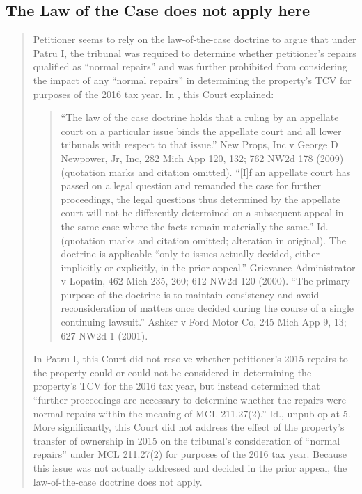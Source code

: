 \documentclass[12pt,\documentclassflag]{michiganCourtOfAppealsBrief}
\begin{document}
\subsection{The Law of the Case does not apply here}
\begin {quotation}
  Petitioner seems to rely on the law-of-the-case doctrine to argue that under Patru I, the
tribunal was required to determine whether petitioner's repairs qualified as ``normal repairs'' and
was further prohibited from considering the impact of any ``normal repairs'' in determining the
property's TCV for purposes of the 2016 tax year. In , 
this Court explained:

\begin{quote}
  ``The law of the case doctrine holds that a ruling by an appellate court on a
particular issue binds the appellate court and all lower tribunals with respect to that
issue.'' New Props, Inc v George D Newpower, Jr, Inc, 282 Mich App 120, 132;
762 NW2d 178 (2009) (quotation marks and citation omitted). ``[I]f an appellate
court has passed on a legal question and remanded the case for further proceedings,
the legal questions thus determined by the appellate court will not be differently
determined on a subsequent appeal in the same case where the facts remain
materially the same.'' Id. (quotation marks and citation omitted; alteration in
original). The doctrine is applicable ``only to issues actually decided, either
implicitly or explicitly, in the prior appeal.'' Grievance Administrator v Lopatin,
462 Mich 235, 260; 612 NW2d 120 (2000). ``The primary purpose of the doctrine
is to maintain consistency and avoid reconsideration of matters once decided during
the course of a single continuing lawsuit.'' Ashker v Ford Motor Co, 245 Mich App
9, 13; 627 NW2d 1 (2001).
\end{quote}

In Patru I, this Court did not resolve whether petitioner's 2015 repairs to the property could or
could not be considered in determining the property's TCV for the 2016 tax year, but instead
determined that ``further proceedings are necessary to determine whether the repairs were normal
repairs within the meaning of MCL 211.27(2).'' Id., unpub op at 5. More significantly, this Court
did not address the effect of the property's transfer of ownership in 2015 on the tribunal's
consideration of ``normal repairs'' under MCL 211.27(2) for purposes of the 2016 tax year.
Because this issue was not actually addressed and decided in the prior appeal, the law-of-the-case
doctrine does not apply.


\end{quotation}
\end{document}
